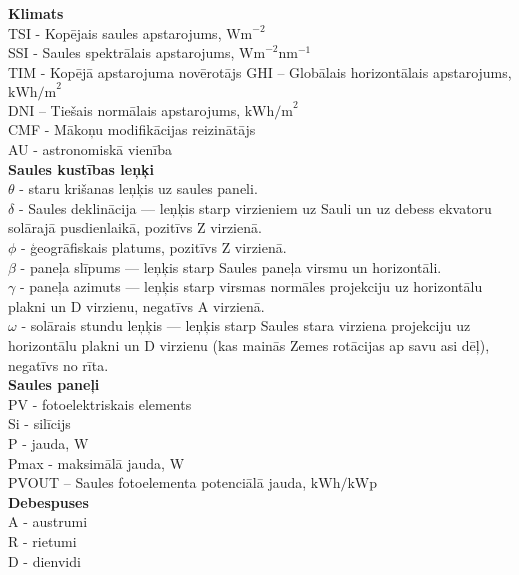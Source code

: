 \noindent 
\textbf{Klimats}\\
TSI - Kopējais saules apstarojums, $\textrm{Wm}^{-2}$\\
SSI - Saules spektrālais apstarojums, $\textrm{Wm}^{-2}\textrm{nm}^{-1}$\\
TIM - Kopējā apstarojuma novērotājs
GHI – Globālais horizontālais apstarojums,  $\textrm{kWh/m}^2$\\ %
DNI – Tiešais normālais apstarojums, $\textrm{kWh/m}^2$\\ %
CMF - Mākoņu modifikācijas reizinātājs\\
AU - astronomiskā vienība\\  %
\textbf{Saules kustības leņķi}\\
$\theta$ - staru krišanas leņķis uz saules paneli.\\
$\delta$ - Saules deklinācija --- leņķis starp virzieniem uz Sauli un uz debess ekvatoru solārajā pusdienlaikā, pozitīvs Z virzienā.\\
 $\phi$  - ģeogrāfiskais platums, pozitīvs Z virzienā.\\
$\beta$  - paneļa slīpums --- leņķis starp Saules paneļa virsmu un horizontāli.\\
$\gamma$ - paneļa azimuts --- leņķis starp virsmas normāles projekciju uz horizontālu  plakni un D virzienu, negatīvs A virzienā.\\
$\omega$ - solārais stundu leņķis --- leņķis starp Saules stara virziena projekciju uz horizontālu plakni un D virzienu (kas mainās Zemes rotācijas ap  savu asi dēļ), negatīvs no rīta.\\
\textbf{Saules paneļi}\\
PV - fotoelektriskais elements\\ %
Si - silīcijs\\
P - jauda, 	W\\
Pmax - maksimālā jauda, W\\
PVOUT – Saules fotoelementa potenciālā jauda, $\textrm{kWh/kWp}$\\ %
\textbf{Debespuses}\\
A - austrumi\\
R - rietumi\\
D - dienvidi\\